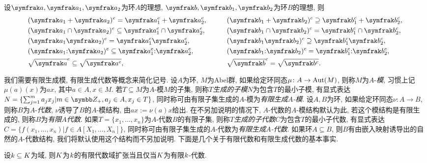 \begin{proposition}\label{prop:extencontrop}
    设$\ideal{a}, \ideal{a}_1, \ideal{a}_2$为环$A$的理想, $\ideal{b}, \ideal{b}_1, \ideal{b}_2$为环$B$的理想, 则
    \begin{equation*}
        \begin{aligned}
            &(\ideal{a}_1+\ideal{a}_2)^e=\ideal{a}_1^e+\ideal{a}_2^e,
            &&\qquad(\ideal{b}_1+\ideal{b_2})^c\supseteq \ideal{b}_1^c+\ideal{b}_2^c,\\
            &(\ideal{a}_1\cap\ideal{a}_2)^e\subseteq\ideal{a}_1^e\cap\ideal{a}_2^e,
            &&\qquad(\ideal{b}_1\cap\ideal{b_2})^c= \ideal{b}_1^c\cap\ideal{b}_2^c,\\
            &(\ideal{a}_1\ideal{a}_2)^e=\ideal{a}_1^e\ideal{a}_2^e,
            &&\qquad(\ideal{b}_1\ideal{b_2})^c\supseteq\ideal{b}_1^c\ideal{b}_2^c,\\
            &(\ideal{a}_1{:}\ideal{a}_2)^e\subseteq\ideal{a}_1^e{:}\ideal{a}_2^e,
            &&\qquad(\ideal{b}_1{:}\ideal{b_2})^c= \ideal{b}_1^c{:}\ideal{b}_2^c,\\
            &\sqrt{\ideal{a}}^e\subseteq\sqrt{\ideal{a}^e},
            &&\qquad\sqrt{\ideal{b}}^c= \sqrt{\ideal{b}^c}.
        \end{aligned}
    \end{equation*}
\end{proposition}

我们需要有限生成模, 有限生成代数等概念来简化记号. 设$A$为环, $M$为Abel群, 如果给定环同态$\mu\colon A\to \operatorname{Aut}(M)$, 则称$M$为$A$-\emph{模}, 习惯上记$\mu(a)(x)$为$ax$, 其中$a\in A, x\in M$. 若$T\subseteq M$为$A$-模$M$的子集, 则称$T$\emph{生成的子模}$N$为包含$T$的最小子模, 有显式表达$N=\{\sum_{j=1}^m a_jx_j\vert m\in\ZZ_+, a_j\in A, x_j\in T\}$, 同时称可由有限子集生成的$A$-模为\emph{有限生成$A$-模}. 设$A, B$为环, 如果给定环同态$\nu\colon A\to B$, 则称$B$为$A$-\emph{代数}, $\nu$诱导了$B$的$A$-模结构, 由$ax:=\nu(a)x$给出. 在不另加说明的情况下, $A$-代数的$A$-模结构默认为此, 若这个模结构是有限生成的, 则称$B$为\emph{有限$A$代数}. 如果$T=\{x_1, \dotsc, x_n\}$为$A$-代数$B$的有限子集, 则称$T$\emph{生成的子代数}$C$为包含$T$的最小子代数, 有显式表达$C=\{f(x_1, \dotsc, x_n)\vert f\in A[X_1, \dotsc, X_n]\}$, 同时称可由有限子集生成的$A$-代数为\emph{有限生成$A$-代数}. 如果环$A\subseteq B$, 则$B$有由嵌入映射诱导出的自然的$A$-代数结构, 我们将默认使用这个结构而不另加说明. 下面是几个关于有限代数和有限生成代数的基本事实.

\begin{proposition}
    设$k\subseteq K$为域, 则$K$为$k$的有限代数域扩张当且仅当$K$为有限$k$-代数.
\end{proposition}

